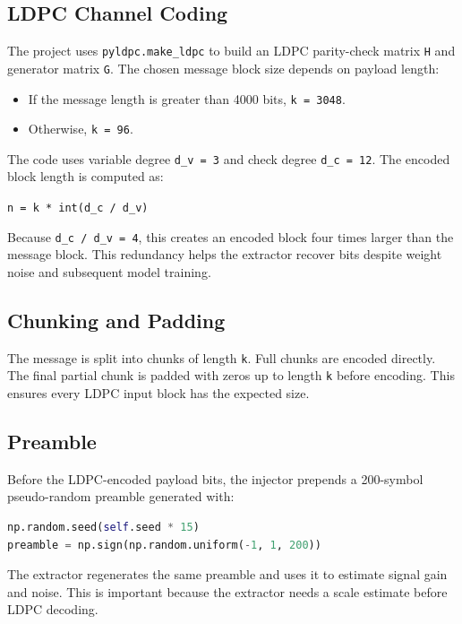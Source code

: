 \documentclass[11pt,a4paper]{article}
\newcommand{\code}[1]{\texttt{#1}}
\begin{document}
\subsection{LDPC Channel Coding}

The project uses \code{pyldpc.make\_ldpc} to build an LDPC parity-check matrix \code{H} and generator matrix \code{G}. The chosen message block size depends on payload length:

\begin{itemize}[leftmargin=1.4em]
  \item If the message length is greater than 4000 bits, \code{k = 3048}.
  \item Otherwise, \code{k = 96}.
\end{itemize}

The code uses variable degree \code{d\_v = 3} and check degree \code{d\_c = 12}. The encoded block length is computed as:

\begin{center}
\code{n = k * int(d\_c / d\_v)}
\end{center}

Because \code{d\_c / d\_v = 4}, this creates an encoded block four times larger than the message block. This redundancy helps the extractor recover bits despite weight noise and subsequent model training.

\subsection{Chunking and Padding}

The message is split into chunks of length \code{k}. Full chunks are encoded directly. The final partial chunk is padded with zeros up to length \code{k} before encoding. This ensures every LDPC input block has the expected size.

\subsection{Preamble}

Before the LDPC-encoded payload bits, the injector prepends a 200-symbol pseudo-random preamble generated with:

\begin{lstlisting}[language=Python]
np.random.seed(self.seed * 15)
preamble = np.sign(np.random.uniform(-1, 1, 200))
\end{lstlisting}

The extractor regenerates the same preamble and uses it to estimate signal gain and noise. This is important because the extractor needs a scale estimate before LDPC decoding.
\end{document}
